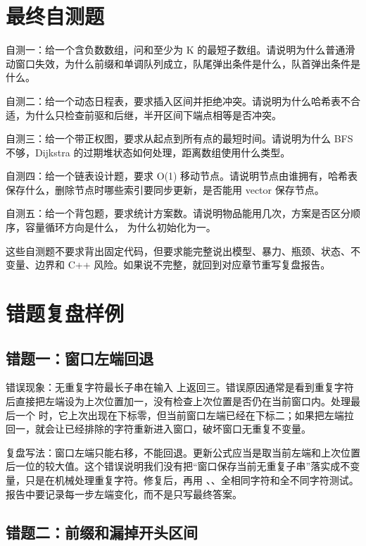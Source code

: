 \section{最终自测题}

自测一：给一个含负数数组，问和至少为 K 的最短子数组。请说明为什么普通滑动窗口失效，为什么前缀和单调队列成立，队尾弹出条件是什么，队首弹出条件是什么。

自测二：给一个动态日程表，要求插入区间并拒绝冲突。请说明为什么哈希表不合适，为什么只检查前驱和后继，半开区间下端点相等是否冲突。

自测三：给一个带正权图，要求从起点到所有点的最短时间。请说明为什么 BFS 不够，Dijkstra 的过期堆状态如何处理，距离数组使用什么类型。

自测四：给一个链表设计题，要求 O(1) 移动节点。请说明节点由谁拥有，哈希表保存什么，删除节点时哪些索引要同步更新，是否能用 vector 保存节点。

自测五：给一个背包题，要求统计方案数。请说明物品能用几次，方案是否区分顺序，容量循环方向是什么， 为什么初始化为一。

这些自测题不要求背出固定代码，但要求能完整说出模型、暴力、瓶颈、状态、不变量、边界和 C++ 风险。如果说不完整，就回到对应章节重写复盘报告。

\section{错题复盘样例}

\subsection{错题一：窗口左端回退}

错误现象：无重复字符最长子串在输入  上返回三。错误原因通常是看到重复字符后直接把左端设为上次位置加一，没有检查上次位置是否仍在当前窗口内。处理最后一个  时，它上次出现在下标零，但当前窗口左端已经在下标二；如果把左端拉回一，就会让已经排除的字符重新进入窗口，破坏窗口无重复不变量。

复盘写法：窗口左端只能右移，不能回退。更新公式应当是取当前左端和上次位置后一位的较大值。这个错误说明我们没有把“窗口保存当前无重复子串”落实成不变量，只是在机械处理重复字符。修复后，再用 、、全相同字符和全不同字符测试。报告中要记录每一步左端变化，而不是只写最终答案。

\subsection{错题二：前缀和漏掉开头区间}

